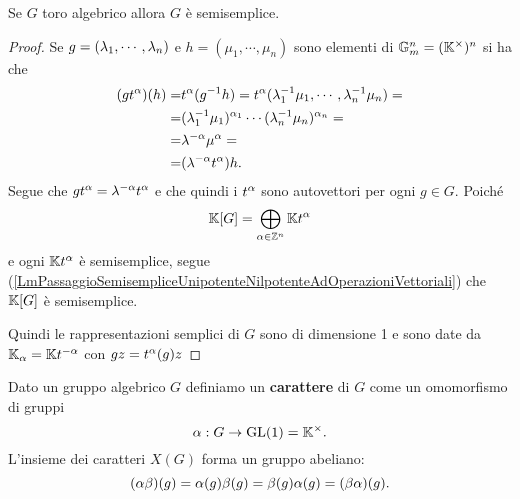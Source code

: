 \begin{proposition}\label{PrToriAlgebriciSonoSemisemplici}
Se $G$ toro algebrico allora $G$ \`e semisemplice.
\end{proposition}
\begin{proof}
Se $g=(\lambda_1,\cdots, \lambda_n)$ e $h=(\mu_1,\cdots, \mu_n)$ sono elementi di $\mathbb{G}_m^n=(\mathbb{K}^\times)^n$ si ha che
\begin{align*}
(gt^\alpha)(h)=&t^\alpha(g^{-1} h)=t^\alpha(\lambda_1^{-1} \mu_1,\cdots, \lambda_n^{-1}\mu_n)=\\
=&(\lambda_1^{-1}\mu_1)^{\alpha_1}\cdots (\lambda_n^{-1}\mu_n)^{\alpha_n}=\\
=&\lambda^{-\alpha}\mu^\alpha=\\
=&(\lambda^{-\alpha}t^\alpha)h.
\end{align*}
Segue che $gt^\alpha=\lambda^{-\alpha}t^\alpha$ e che quindi i $t^\alpha$ sono autovettori per ogni $g\in G$. Poich\'e
\[\mathbb{K}[G]=\bigoplus_{\alpha\in\mathbb{Z}^n} \mathbb{K} t^\alpha\]
e ogni $\mathbb{K} t^\alpha$ \`e semisemplice, segue (\ref{LmPassaggioSemisempliceUnipotenteNilpotenteAdOperazioniVettoriali}) che $\mathbb{K}[G]$ \`e semisemplice.

Quindi le rappresentazioni semplici di $G$ sono di dimensione 1 e sono date da $\mathbb{K}_\alpha=\mathbb{K} t^{-\alpha}$ con $gz=t^\alpha(g)z$
\end{proof}


\begin{definition}
Dato un gruppo algebrico $G$ definiamo un \textbf{carattere} di $G$ come un omomorfismo di gruppi
\[\alpha:G\to \operatorname{GL}(1)=\mathbb{K}^\times.\]
L'insieme dei caratteri $X(G)$ forma un gruppo abeliano:
\[(\alpha\beta)(g)=\alpha(g)\beta(g)=\beta(g)\alpha(g)=(\beta\alpha)(g).\]
\end{definition}


